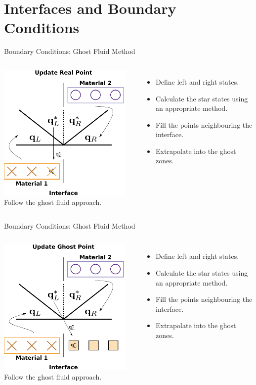 \documentclass{beamer}
\begin{document}
\section{Interfaces and Boundary Conditions}

\begin{frame}{Boundary Conditions: Ghost Fluid Method}
\begin{columns}
\column{6.5cm}
\centering
\includegraphics[width=6.5cm]{../images/multimodel_roe_real}
\column{4.5cm}
Follow the ghost fluid approach.
\begin{itemize}
\item{Define left and right states.}
\item{Calculate the star states using an appropriate method.}
\item{Fill the points neighbouring the interface.}
\item{Extrapolate into the ghost zones.}
\end{itemize}
\end{columns}
\end{frame}
\begin{frame}{Boundary Conditions: Ghost Fluid Method}
\begin{columns}
\column{6.5cm}
\centering
\includegraphics[width=6.5cm]{../images/multimodel_roe_ghost}
\column{4.5cm}
Follow the ghost fluid approach.
\begin{itemize}
\item{Define left and right states.}
\item{Calculate the star states using an appropriate method.}
\item{Fill the points neighbouring the interface.}
\item{Extrapolate into the ghost zones.}
\end{itemize}
\end{columns}
\end{frame}
\end{document}
